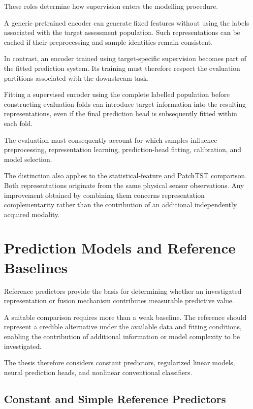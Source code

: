 These roles determine how supervision enters the modelling procedure.

A generic pretrained encoder can generate fixed features without using the labels associated with the target assessment population. Such representations can be cached if their preprocessing and sample identities remain consistent.

In contrast, an encoder trained using target-specific supervision becomes part of the fitted prediction system. Its training must therefore respect the evaluation partitions associated with the downstream task.

Fitting a supervised encoder using the complete labelled population before constructing evaluation folds can introduce target information into the resulting representations, even if the final prediction head is subsequently fitted within each fold.

The evaluation must consequently account for which samples influence preprocessing, representation learning, prediction-head fitting, calibration, and model selection.

The distinction also applies to the statistical-feature and PatchTST comparison. Both representations originate from the same physical sensor observations. Any improvement obtained by combining them concerns representation complementarity rather than the contribution of an additional independently acquired modality.

\section{Prediction Models and Reference Baselines}

Reference predictors provide the basis for determining whether an investigated representation or fusion mechanism contributes measurable predictive value.

A suitable comparison requires more than a weak baseline. The reference should represent a credible alternative under the available data and fitting conditions, enabling the contribution of additional information or model complexity to be investigated.

The thesis therefore considers constant predictors, regularized linear models, neural prediction heads, and nonlinear conventional classifiers.

\subsection{Constant and Simple Reference Predictors}

